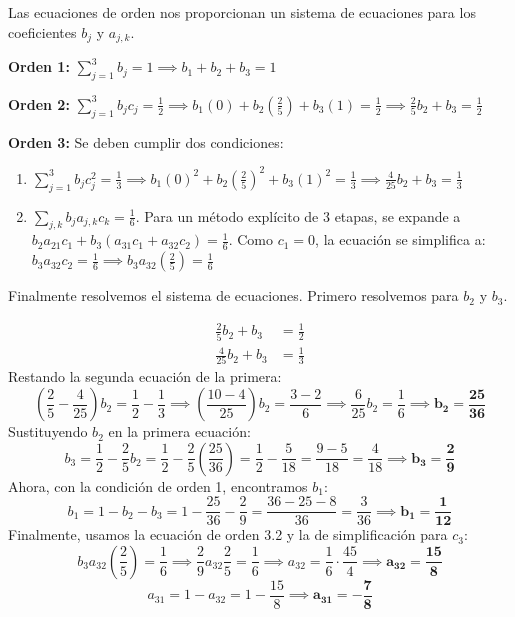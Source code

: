 \documentclass{article}
\begin{document}
Las ecuaciones de orden nos proporcionan un sistema de ecuaciones para los coeficientes $b_j$ y $a_{j,k}$.

\textbf{Orden 1:} $\sum_{j=1}^{3} b_j = 1 \implies b_1 + b_2 + b_3 = 1$

\textbf{Orden 2:} $\sum_{j=1}^{3} b_j c_j = \frac{1}{2} \implies b_1(0) + b_2(\frac{2}{5}) + b_3(1) = \frac{1}{2} \implies \frac{2}{5}b_2 + b_3 = \frac{1}{2}$

\textbf{Orden 3:} Se deben cumplir dos condiciones:
\begin{enumerate}
    \item $\sum_{j=1}^{3} b_j c_j^2 = \frac{1}{3} \implies b_1(0)^2 + b_2(\frac{2}{5})^2 + b_3(1)^2 = \frac{1}{3} \implies \frac{4}{25}b_2 + b_3 = \frac{1}{3}$
    \item $\sum_{j,k} b_j a_{j,k} c_k = \frac{1}{6}$. Para un método explícito de 3 etapas, se expande a $b_2 a_{21} c_1 + b_3(a_{31}c_1 + a_{32}c_2) = \frac{1}{6}$. Como $c_1=0$, la ecuación se simplifica a: $b_3 a_{32} c_2 = \frac{1}{6} \implies b_3 a_{32} (\frac{2}{5}) = \frac{1}{6}$
\end{enumerate}

Finalmente resolvemos el sistema de ecuaciones. Primero resolvemos para $b_2$ y $b_3$.

\begin{align*}
    \frac{2}{5}b_2 + b_3 &= \frac{1}{2} \\
    \frac{4}{25}b_2 + b_3 &= \frac{1}{3}
\end{align*}
Restando la segunda ecuación de la primera:
$$ \left(\frac{2}{5} - \frac{4}{25}\right)b_2 = \frac{1}{2} - \frac{1}{3} \implies \left(\frac{10-4}{25}\right)b_2 = \frac{3-2}{6} \implies \frac{6}{25}b_2 = \frac{1}{6} \implies \boldsymbol{b_2 = \frac{25}{36}} $$
Sustituyendo $b_2$ en la primera ecuación:
$$ b_3 = \frac{1}{2} - \frac{2}{5}b_2 = \frac{1}{2} - \frac{2}{5}\left(\frac{25}{36}\right) = \frac{1}{2} - \frac{5}{18} = \frac{9-5}{18} = \frac{4}{18} \implies \boldsymbol{b_3 = \frac{2}{9}} $$
Ahora, con la condición de orden 1, encontramos $b_1$:
$$ b_1 = 1 - b_2 - b_3 = 1 - \frac{25}{36} - \frac{2}{9} = \frac{36 - 25 - 8}{36} = \frac{3}{36} \implies \boldsymbol{b_1 = \frac{1}{12}} $$
Finalmente, usamos la ecuación de orden 3.2 y la de simplificación para $c_3$:
$$ b_3 a_{32} \left(\frac{2}{5}\right) = \frac{1}{6} \implies \frac{2}{9} a_{32} \frac{2}{5} = \frac{1}{6} \implies a_{32} = \frac{1}{6} \cdot \frac{45}{4} \implies \boldsymbol{a_{32} = \frac{15}{8}} $$
$$ a_{31} = 1 - a_{32} = 1 - \frac{15}{8} \implies \boldsymbol{a_{31} = -\frac{7}{8}} $$
\end{document}
